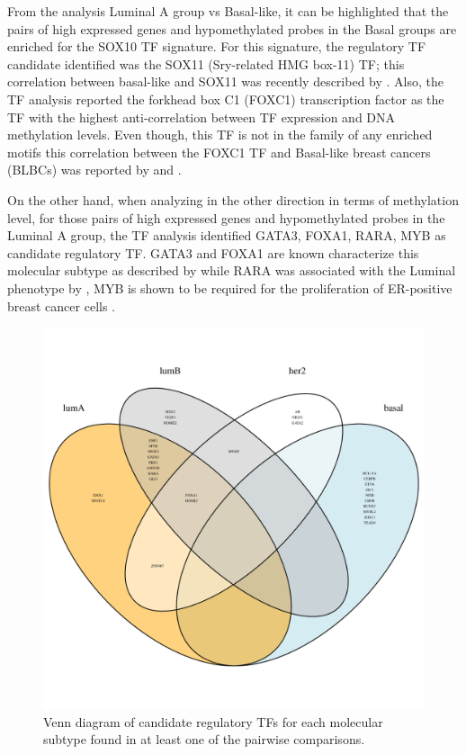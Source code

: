 From the  analysis Luminal A group vs Basal-like, it can be highlighted that the pairs of
high expressed genes and hypomethylated probes in the Basal groups are enriched for the SOX10 TF signature.
For this signature, the regulatory TF candidate identified was the SOX11 (Sry-related HMG box-11) TF; this
correlation between basal-like and SOX11 was recently described by .
Also, the TF analysis reported the forkhead box C1 (FOXC1) transcription factor as the TF with the
highest anti-correlation between TF expression and DNA methylation levels. Even though,
this TF is not in the family of any enriched motifs this correlation between the FOXC1 TF and Basal-like
breast cancers (BLBCs) was reported by  and .

On the other hand, when analyzing in the other direction in terms of methylation level, for  those pairs of high expressed genes and hypomethylated probes in the Luminal A group, the TF analysis identified GATA3, FOXA1, RARA, MYB as candidate regulatory TF. GATA3 and FOXA1 are known characterize this  molecular subtype  as described by  while RARA was associated with the Luminal phenotype by , MYB
is shown to be required for the proliferation of ER-positive breast cancer cells \cite{mitra2016cdk9}.

\begin{figure}[ht!]
\centering
\includegraphics[width=1.0\textwidth]{images/BRCA_ven.pdf}
\caption{\label{fig:venn} Venn diagram of candidate regulatory TFs for each molecular subtype found in at least one of the pairwise comparisons.}
\end{figure}
